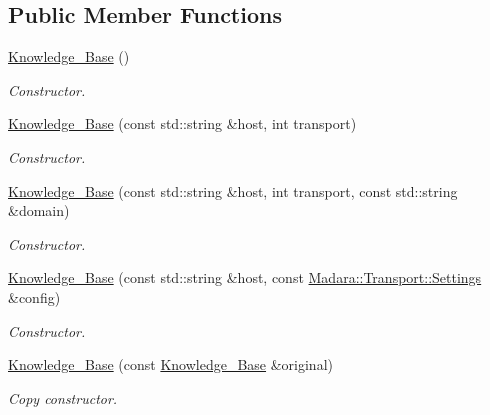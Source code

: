 \subsection*{Public Member Functions}
\begin{DoxyCompactItemize}
\item 
\hyperlink{classMadara_1_1Knowledge__Engine_1_1Knowledge__Base_a4b9e119c21c60b2f370dded04b1145b2}{Knowledge\_\-Base} ()
\begin{DoxyCompactList}\small\item\em Constructor. \item\end{DoxyCompactList}\item 
\hyperlink{classMadara_1_1Knowledge__Engine_1_1Knowledge__Base_a2d209942f62dc3eb238024ea457d5d0b}{Knowledge\_\-Base} (const std::string \&host, int transport)
\begin{DoxyCompactList}\small\item\em Constructor. \item\end{DoxyCompactList}\item 
\hyperlink{classMadara_1_1Knowledge__Engine_1_1Knowledge__Base_a499e89d75cce7d69f3e9aff72a3c87b9}{Knowledge\_\-Base} (const std::string \&host, int transport, const std::string \&domain)
\begin{DoxyCompactList}\small\item\em Constructor. \item\end{DoxyCompactList}\item 
\hyperlink{classMadara_1_1Knowledge__Engine_1_1Knowledge__Base_a6d496d93753553470eb7346fee212ce3}{Knowledge\_\-Base} (const std::string \&host, const \hyperlink{classMadara_1_1Transport_1_1Settings}{Madara::Transport::Settings} \&config)
\begin{DoxyCompactList}\small\item\em Constructor. \item\end{DoxyCompactList}\item 
\hyperlink{classMadara_1_1Knowledge__Engine_1_1Knowledge__Base_a5a34c40e07b04ec21421e3faed58ed0d}{Knowledge\_\-Base} (const \hyperlink{classMadara_1_1Knowledge__Engine_1_1Knowledge__Base}{Knowledge\_\-Base} \&original)
\begin{DoxyCompactList}\small\item\em Copy constructor. \item\end{DoxyCompactList}\item 

\end{DoxyCompactItemize}
